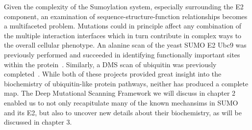 Given the complexity of the Sumoylation system, especially surrounding the E2 component, an examination of sequence-structure-function relationships becomes a multifaceted problem. Mutations could in principle affect any combination of the multiple interaction interfaces which in turn contribute in complex ways to the overall cellular phenotype.
An alanine scan of the yeast SUMO E2 Ubc9 was previously performed and succeeded in identifying functionally important sites within the protein~\cite{bencsath_identification_2002}. Similarly, a DMS scan of ubiquitin was previously completed~\cite{roscoe_analyses_2013}. While both of these projects provided great insight into the biochemistry of ubiquitin-like protein pathways, neither has produced a complete map. The Deep Mutational Scanning Framework we will discuss in chapter 2 enabled us to not only recapitulate many of the known mechansims in SUMO and its E2, but also to uncover new details about their biochemistry, as will be discussed in chapter 3.